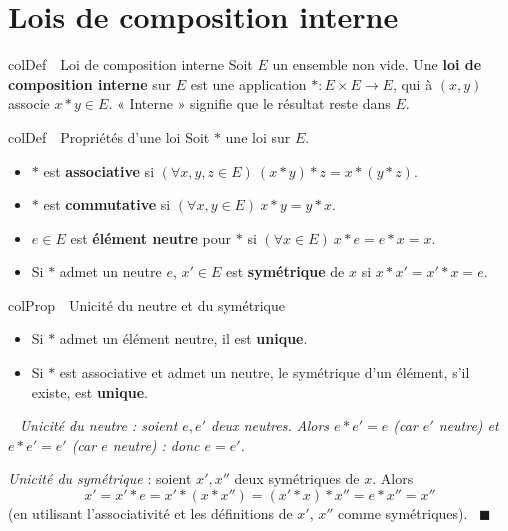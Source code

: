 \documentclass[11pt,a4paper]{article}
\newenvironment{definition}[1][Définition]
  {\begin{fiche}{colDef}{\ding{110}~~#1}}{\end{fiche}}
\newenvironment{propriete}[1][Propriété]
  {\begin{fiche}{colProp}{\ding{72}~~#1}}{\end{fiche}}
\newenvironment{demo}
  {\par\smallskip\noindent{\sffamily\bfseries\color{qtealdark}Démonstration.}\ \itshape}
  {\ \normalfont\hfill$\blacksquare$\par\medskip}
\begin{document}
\vspace{4mm}

\section{Lois de composition interne}

\begin{definition}[Loi de composition interne]
Soit $E$ un ensemble non vide. Une \textbf{loi de composition interne} sur $E$ est une application $*:E\times E\to E$, qui à $(x,y)$ associe $x*y\in E$. « Interne » signifie que le résultat reste dans $E$.
\end{definition}

\begin{definition}[Propriétés d'une loi]
Soit $*$ une loi sur $E$.
\begin{itemize}[leftmargin=6mm, itemsep=0.5mm]
  \item $*$ est \textbf{associative} si $(\forall x,y,z\in E)\ (x*y)*z=x*(y*z)$.
  \item $*$ est \textbf{commutative} si $(\forall x,y\in E)\ x*y=y*x$.
  \item $e\in E$ est \textbf{élément neutre} pour $*$ si $(\forall x\in E)\ x*e=e*x=x$.
  \item Si $*$ admet un neutre $e$, $x'\in E$ est \textbf{symétrique} de $x$ si $x*x'=x'*x=e$.
\end{itemize}
\end{definition}

\begin{propriete}[Unicité du neutre et du symétrique]
\begin{itemize}[leftmargin=6mm, itemsep=0.5mm]
  \item Si $*$ admet un élément neutre, il est \textbf{unique}.
  \item Si $*$ est associative et admet un neutre, le symétrique d'un élément, s'il existe, est \textbf{unique}.
\end{itemize}
\end{propriete}

\begin{demo}
\emph{Unicité du neutre} : soient $e,e'$ deux neutres. Alors $e*e'=e$ (car $e'$ neutre) et $e*e'=e'$ (car $e$ neutre) : donc $e=e'$.

\smallskip
\emph{Unicité du symétrique} : soient $x',x''$ deux symétriques de $x$. Alors
\[
  x' = x'*e = x'*(x*x'') = (x'*x)*x'' = e*x'' = x''
\]
(en utilisant l'associativité et les définitions de $x'$, $x''$ comme symétriques).
\end{demo}
\end{document}
